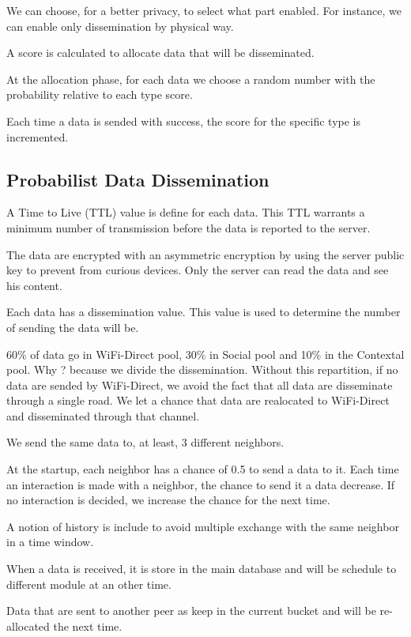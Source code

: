 We can choose, for a better privacy, to select what part enabled. For instance, we can enable only dissemination by physical way.

A score is calculated to allocate data that will be disseminated.

At the allocation phase, for each data we choose a random number with the probability relative to each type score. 

Each time a data is sended with success, the score for the specific type is incremented.

\subsection{Probabilist Data Dissemination}



A Time to Live (TTL) value is define for each data.
This TTL warrants a minimum number of transmission before the data is reported to the server.

The data are encrypted with an asymmetric encryption by using the server public key to prevent from curious devices. Only the server can read the data and see his content.

Each data has a dissemination value.
This value is used to determine the number of sending the data will be.

60\% of data go in WiFi-Direct pool, 30\% in Social pool and 10\% in the Contextal pool.
Why ? because we divide the dissemination. Without this repartition, if no data are sended by WiFi-Direct, we avoid the fact that all data are disseminate through a single road.
We let a chance that data are realocated to WiFi-Direct and disseminated through that channel.

We send the same data to, at least, 3 different neighbors.

At the startup, each neighbor has a chance of 0.5 to send a data to it. Each time an interaction is made with a neighbor, the chance to send it a data decrease. If no interaction is decided, we increase the chance for the next time.

A notion of history is include to avoid multiple exchange with the same neighbor in a time window.

When a data is received, it is store in the main database and will be schedule to different module at an other time.

Data that are sent to another peer as keep in the current bucket and will be re-allocated the next time.